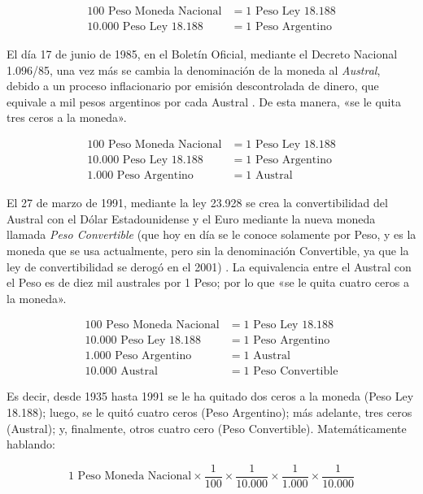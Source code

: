 \documentclass[12pt,a4paper,twoside]{book}
\begin{document}
\begin{align*}
100 \text{ Peso Moneda Nacional} &= 1 \text{ Peso Ley 18.188} \\
10.000 \text{ Peso Ley 18.188} &= 1 \text{ Peso Argentino}
\end{align*}

El día 17 de junio de 1985, en el Boletín Oficial, mediante el Decreto Nacional 1.096/85, una vez más se cambia la denominación de la moneda al \textit{Austral}, debido a un proceso inflacionario por emisión descontrolada de dinero, que equivale a mil pesos argentinos por cada Austral \cite{dineroarg:austr}. De esta manera, «se le quita tres ceros a la moneda».

\begin{align*}
100 \text{ Peso Moneda Nacional} &= 1 \text{ Peso Ley 18.188} \\
10.000 \text{ Peso Ley 18.188} &= 1 \text{ Peso Argentino} \\
1.000 \text{ Peso Argentino} &= 1 \text{ Austral}
\end{align*}

El 27 de marzo de 1991, mediante la ley 23.928 se crea la convertibilidad del Austral con el Dólar Estadounidense y el Euro mediante la nueva moneda llamada \textit{Peso Convertible} (que hoy en día se le conoce solamente por Peso, y es la moneda que se usa actualmente, pero sin la denominación Convertible, ya que la ley de convertibilidad se derogó en el 2001) \cite{dineroarg:act}. La equivalencia entre el Austral con el Peso es de diez mil australes por 1 Peso; por lo que «se le quita cuatro ceros a la moneda».

\begin{align*}
100 \text{ Peso Moneda Nacional} &= 1 \text{ Peso Ley 18.188} \\
10.000 \text{ Peso Ley 18.188} &= 1 \text{ Peso Argentino} \\
1.000 \text{ Peso Argentino} &= 1 \text{ Austral} \\
10.000 \text{ Austral} &= 1 \text{ Peso Convertible}
\end{align*}

Es decir, desde 1935 hasta 1991 se le ha quitado dos ceros a la moneda (Peso Ley 18.188); luego, se le quitó cuatro ceros (Peso Argentino); más adelante, tres ceros (Austral); y, finalmente, otros cuatro cero (Peso Convertible). Matemáticamente hablando:

\[
1 \text{ Peso Moneda Nacional} \times \dfrac{1}{100} \times \dfrac{1}{10.000} \times \dfrac{1}{1.000} \times \dfrac{1}{10.000}
\]
\end{document}
